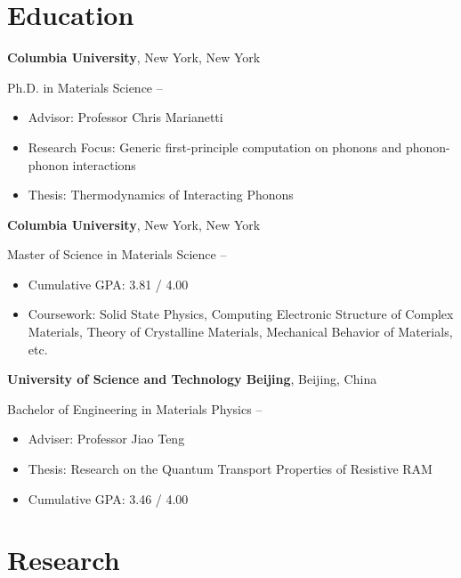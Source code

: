 \documentclass[
  a4paper,
  12pt
]{cv}
\author{Lyuwen Fu}
\begin{document}
\maketitle

\section{Education}

{\textbf{Columbia University}},
New York, New York

Ph.D. in
{Materials Science}
\hfill
{} --
\begin{itemize}
\item Advisor: Professor Chris Marianetti
\item Research Focus: Generic first-principle computation on phonons and phonon-phonon interactions
\item Thesis: Thermodynamics of Interacting Phonons
\end{itemize}


{\textbf{Columbia University}},
New York, New York

Master of Science in
{Materials Science}
\hfill
{} --
\begin{itemize}
\item Cumulative GPA: 3.81 / 4.00
\item Coursework: Solid State Physics, Computing Electronic Structure of Complex Materials, Theory of Crystalline Materials, Mechanical Behavior of Materials, etc.
\end{itemize}


{\textbf{University of Science and Technology Beijing}},
Beijing, China

Bachelor of Engineering in
{Materials Physics}
\hfill
{} --
\begin{itemize}
\item Adviser: Professor Jiao Teng
\item Thesis: Research on the Quantum Transport Properties of Resistive RAM
\item Cumulative GPA: 3.46 / 4.00
\end{itemize}


\section{Research}
\end{document}

